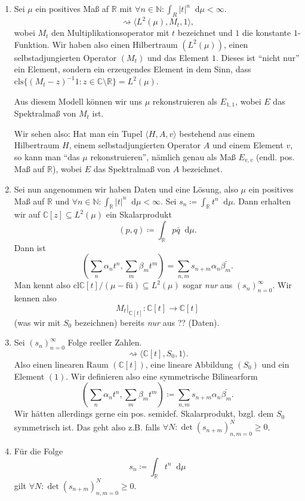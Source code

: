 \documentclass[letterpaper, 11pt]{article}
\newcommand{\R}{\mathbb{R}}
\newcommand{\C}{\mathbb{C}}
\newcommand{\N}{\mathbb{N}}
\newcommand{\1}{\mathds{1}}
\newcommand{\diff}{\mathop{}\!\mathrm{d}}
\theoremstyle{definition}
\begin{document}
\begin{enumerate}
  \item Sei $\mu$ ein positives Maß af $\R$ mit $\forall n \in \N : \int_R \vert t \vert^n \diff \mu < \infty$.
  $$ \rightsquigarrow \langle L^2(\mu), M_t, 1 \rangle, $$
  wobei $M_t$ den Multiplikationsoperator mit $t$ bezeichnet und $1$ die konstante $1$-Funktion. Wir haben also einen Hilbertraum $(L^2(\mu))$, einen selbstadjungierten Operator $(M_t)$ und das Element $1$. Dieses ist ``nicht nur'' ein Element, sondern ein erzeugendes Element in dem Sinn, dass $\mathrm{cls} \{ (M_t - z)^{-1}1 : z \in \C \setminus \R \} = L^2(\mu)$.

  Aus diesem Modell können wir uns $\mu$ rekonstruieren als $E_{1,1}$, wobei $E$ das Spektralmaß von $M_t$ ist.

  Wir sehen also: Hat man ein Tupel $\langle H, A, v \rangle$ bestehend aus einem Hilbertraum $H$, einem selbstadjungierten Operator $A$ und einem Element $v$, so kann man ``das $\mu$ rekonstruieren'', nämlich genau als Maß $E_{v,v}$ (endl. pos. Maß auf $\R$), wobei $E$ das Spektralmaß von $A$ bezeichnet.

  \item Sei nun angenommen wir haben Daten und eine Lösung, also $\mu$ ein positives Maß auf $\R$ und $\forall n \in \N : \int_\R \vert t \vert^n \diff \mu < \infty$. Sei $s_n \coloneqq \int_\R t^n \diff \mu$. Dann erhalten wir auf $\C[z] \subseteq L^2(\mu)$ ein Skalarprodukt
  $$ (p, q) \coloneqq \int_\R p \bar{q} \diff \mu. $$
  Dann ist
  $$ (\sum_n \alpha_n t^n, \sum_m \beta_m t^m) = \sum_{n,m} s_{n+m} \alpha_n \bar{\beta_m}. $$
  Man kennt also $\mathrm{cl} \C[t] / (\mu-\textrm{fü}) \subseteq L^2(\mu)$ sogar \emph{nur} aus $(s_n)_{n=0}^\infty$. Wir kennen also
  $$ M_t \vert_{\C[t]} : \C[t] \to \C[t] $$
  (was wir mit $S_0$ bezeichnen) bereits \emph{nur} aus ?? (Daten).

  \item Sei $(s_n)_{n=0}^\infty$ Folge reeller Zahlen.
  $$ \rightsquigarrow \langle \C[t], S_0, 1 \rangle. $$
  Also einen linearen Raum $(\C[t])$, eine lineare Abbildung $(S_0)$ und ein Element $(1)$. Wir definieren also eine symmetrische Bilinearform
  $$ (\sum_n \alpha_n t^n, \sum_m \beta_m t^m) \coloneqq \sum_{n,m} s_{n+m} \alpha_n \bar{\beta_m}. $$
  Wir hätten allerdings gerne ein pos. semidef. Skalarprodukt, bzgl. dem $S_0$ symmetrisch ist. Das geht also z.B. falls $\forall N : \det (s_{n+m})_{n,m=0}^N \geq 0$.

  \item Für die Folge
  $$ s_n \coloneqq \int_\R t^n \diff \mu $$
  gilt $\forall N : \det (s_{n+m})_{n,m=0}^N \geq 0$.


\end{enumerate}
\end{document}
